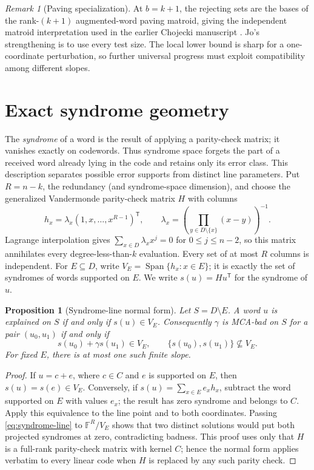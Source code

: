 \documentclass[11pt,a4paper]{amsart}
\numberwithin{equation}{section}
\newtheorem{proposition}[proposition]{Proposition}
\theoremstyle{remark}
\newtheorem{remark}[remark]{Remark}
\DeclareMathOperator{\Span}{Span}
\newcommand{\F}{\mathbb F}
\begin{document}
\begin{remark}[Paving specialization]\label{rem:paving-saving}
At \(b=k+1\), the rejecting sets are the bases of the rank-\((k+1)\)
augmented-word paving matroid, giving the independent matroid
interpretation used in the earlier Chojecki manuscript \cite{RSMCARepo}.
Jo's strengthening is to use every test size.  The local lower bound is
sharp for a one-coordinate perturbation, so further universal progress
must exploit compatibility among different slopes.
\end{remark}


\section{Exact syndrome geometry}
\label{sec:syndrome-exact}

The \emph{syndrome} of a word is the result of applying a parity-check
matrix; it vanishes exactly on codewords.  Thus syndrome space forgets the
part of a received word already lying in the code and retains only its error
class.  This description separates possible error supports from distinct
line parameters.  Put \(R=n-k\), the redundancy (and syndrome-space
dimension), and choose the generalized Vandermonde parity-check matrix
\(H\) with columns
\[
 h_x=\lambda_x(1,x,\ldots,x^{R-1})^{\mathsf T},\qquad
 \lambda_x=\left(\prod_{y\in D\setminus\{x\}}(x-y)\right)^{-1}.
 \tag{3.1}\label{eq:parity-columns}
\]
Lagrange interpolation gives
\(\sum_{x\in D}\lambda_xx^j=0\) for \(0\le j\le n-2\), so this matrix
annihilates every degree-less-than-\(k\) evaluation.  Every set of at most
\(R\) columns is independent.  For \(E\subseteq D\), write
\(V_E=\Span\{h_x:x\in E\}\); it is exactly the set of syndromes of words
supported on \(E\).  We write \(s(u)=Hu^{\mathsf T}\) for the syndrome of
\(u\).

\begin{proposition}[Syndrome-line normal form]
\label{prop:syndrome-line-normal-form}
Let \(S=D\setminus E\).  A word \(u\) is explained on \(S\) if and only if
\(s(u)\in V_E\).  Consequently \(\gamma\) is MCA-bad on \(S\) for a pair
\((u_0,u_1)\) if and only if
\[
 s(u_0)+\gamma s(u_1)\in V_E,
 \qquad
 \{s(u_0),s(u_1)\}\not\subseteq V_E.
 \tag{3.2}\label{eq:syndrome-line}
\]
For fixed \(E\), there is at most one such finite slope.
\end{proposition}

\begin{proof}
If \(u=c+e\), where \(c\in C\) and \(e\) is supported on \(E\), then
\(s(u)=s(e)\in V_E\).  Conversely, if
\(s(u)=\sum_{x\in E}e_xh_x\), subtract the word supported on \(E\) with
values \(e_x\); the result has zero syndrome and belongs to \(C\).  Apply
this equivalence to the line point and to both coordinates.  Passing
\eqref{eq:syndrome-line} to \(\F^R/V_E\) shows that two distinct solutions
would put both projected syndromes at zero, contradicting badness.
This proof uses only that \(H\) is a full-rank parity-check matrix with
kernel \(C\); hence the normal form applies verbatim to every linear code
when \(H\) is replaced by any such parity check.
\end{proof}
\end{document}

